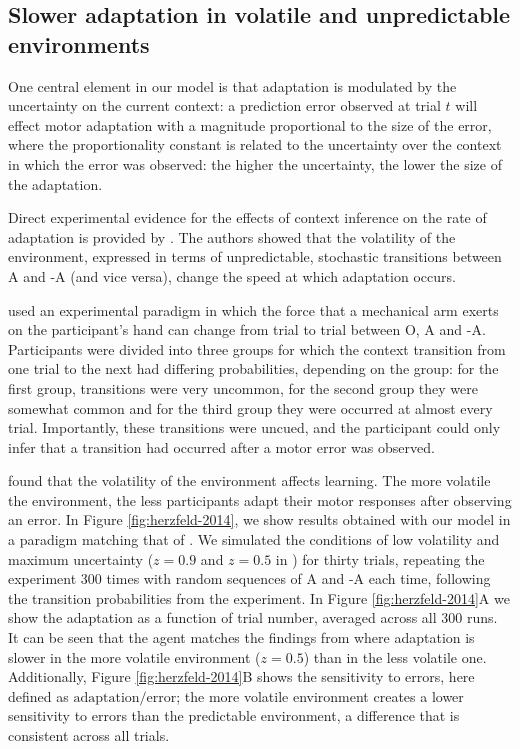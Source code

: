 \documentclass[a4paper,doc,floatsintext,natbib]{apa6}
\def \fref #1{Figure \ref{#1}}     %
\begin{document}
\subsection{Slower adaptation in volatile and unpredictable environments}
One central element in our model is that adaptation is modulated by the uncertainty on the current context: a prediction error observed at trial $t$ will effect motor adaptation with a magnitude proportional to the size of the error, where the proportionality constant is related to the uncertainty over the context in which the error was observed: the higher the uncertainty, the lower the size of the adaptation.

Direct experimental evidence for the effects of context inference on the rate of adaptation is provided by \cite{Herzfeld_memory_2014}. The authors showed that the volatility of the environment, expressed in terms of unpredictable, stochastic transitions between A and -A (and vice versa), change the speed at which adaptation occurs.

\cite{Herzfeld_memory_2014} used an experimental paradigm in which the force that a mechanical arm exerts on the participant's hand can change from trial to trial between O, A and -A. Participants were divided into three groups for which the context transition from one trial to the next had differing probabilities, depending on the group: for the first group, transitions were very uncommon, for the second group they were somewhat common and for the third group they were occurred at almost every trial. Importantly, these transitions were uncued, and the participant could only infer that a transition had occurred after a motor error was observed.

\cite{Herzfeld_memory_2014} found that the volatility of the environment affects learning. The more volatile the environment, the less participants adapt their motor responses after observing an error. In \fref{fig:herzfeld-2014}, we show results obtained with our model in a paradigm matching that of \cite{Herzfeld_memory_2014}. We simulated the conditions of low volatility and maximum uncertainty ($z = 0.9$ and $z = 0.5$ in \cite{Herzfeld_memory_2014}) for thirty trials, repeating the experiment 300 times with random sequences of A and -A each time, following the transition probabilities from the experiment. In \fref{fig:herzfeld-2014}A we show the adaptation as a function of trial number, averaged across all 300 runs. It can be seen that the agent matches the findings from \cite{Herzfeld_memory_2014} where adaptation is slower in the more volatile environment ($z = 0.5$) than in the less volatile one. Additionally, \fref{fig:herzfeld-2014}B shows the sensitivity to errors, here defined as $\text{adaptation} / \text{error}$; the more volatile environment creates a lower sensitivity to errors than the predictable environment, a difference that is consistent across all trials.
\end{document}
